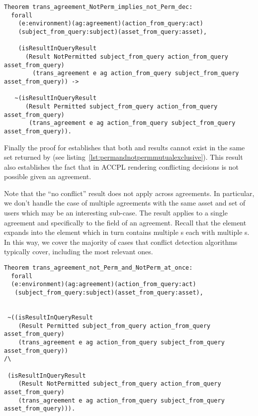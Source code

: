 \begin{lstlisting}
Theorem trans_agreement_NotPerm_implies_not_Perm_dec:
  forall
    (e:environment)(ag:agreement)(action_from_query:act)
    (subject_from_query:subject)(asset_from_query:asset),

    (isResultInQueryResult 
      (Result NotPermitted subject_from_query action_from_query asset_from_query)
        (trans_agreement e ag action_from_query subject_from_query asset_from_query)) ->

   ~(isResultInQueryResult 
      (Result Permitted subject_from_query action_from_query asset_from_query)
       (trans_agreement e ag action_from_query subject_from_query asset_from_query)).
\end{lstlisting}

Finally the proof for  establishes that both  and  results cannot exist in the same set returned by  (see listing~\ref{lst:permandnotpermmutualexclusive}). This result also establishes the fact that in \ac{ACCPL} rendering conflicting decisions is not possible given an agreement. 

Note that the ``no conflict'' result does not apply across agreements. In particular, we don't handle the case of multiple agreements with the same asset and set of users which may be an interesting sub-case. The result applies to a single agreement and specifically to the  field of an agreement. Recall that the  element expands into the  element which in turn contains multiple s each with multiple s. In this way, we cover the majority of cases that conflict detection algorithms typically cover, including the most relevant ones.

\begin{lstlisting}
Theorem trans_agreement_not_Perm_and_NotPerm_at_once:
  forall
  (e:environment)(ag:agreement)(action_from_query:act)
   (subject_from_query:subject)(asset_from_query:asset),


 ~((isResultInQueryResult 
    (Result Permitted subject_from_query action_from_query asset_from_query)
    (trans_agreement e ag action_from_query subject_from_query asset_from_query)) 
/\

 (isResultInQueryResult 
    (Result NotPermitted subject_from_query action_from_query asset_from_query)
    (trans_agreement e ag action_from_query subject_from_query asset_from_query))).

\end{lstlisting}

